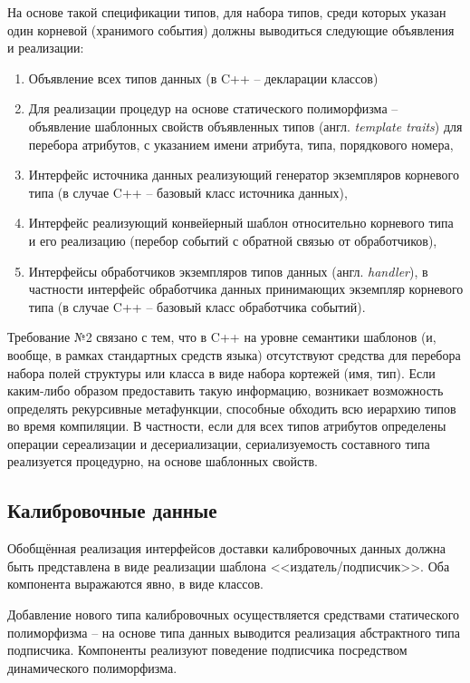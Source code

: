 На основе такой спецификации типов, для набора типов,
среди которых указан один корневой (хранимого события) должны
выводиться следующие объявления и реализации:
\begin{enumerate}
    \item Объявление всех типов данных (в C++ -- декларации классов)
    \item Для реализации процедур на основе статического
    полиморфизма -- объявление
    шаблонных свойств объявленных типов (англ. \emph{template traits}) для
    перебора атрибутов, с указанием имени атрибута, типа, порядкового
    номера,
    \item Интерфейс источника данных реализующий генератор
    экземпляров корневого типа (в случае C++ -- базовый класс
    источника данных),
    \item Интерфейс реализующий конвейерный шаблон
    относительно корневого типа и его реализацию (перебор событий
    с обратной связью от обработчиков),
    \item Интерфейсы обработчиков экземпляров типов данных (англ. \emph{handler}),
    в частности интерфейс обработчика данных принимающих экземпляр
    корневого типа (в случае C++ -- базовый класс обработчика
    событий).
\end{enumerate}

Требование №2 связано с тем, что в C++ на уровне семантики шаблонов
(и, вообще, в рамках стандартных средств языка)
отсутствуют средства для перебора набора полей структуры или класса
в виде набора кортежей (имя, тип). Если каким-либо образом предоставить
такую информацию, возникает возможность определять рекурсивные
метафункции, способные обходить всю иерархию типов во время компиляции.
В частности, если для всех типов атрибутов определены
операции сереализации и десериализации, сериализуемость составного
типа реализуется процедурно, на основе шаблонных свойств.

\subsection{Калибровочные данные}

Обобщённая реализация интерфейсов доставки калибровочных данных
должна быть представлена в виде реализации шаблона <<издатель/подписчик>>.
Оба компонента выражаются явно, в виде классов.

Добавление нового типа калибровочных осуществляется средствами статического
полиморфизма -- на основе типа данных выводится реализация абстрактного
типа подписчика. Компоненты реализуют поведение подписчика посредством
динамического полиморфизма.

